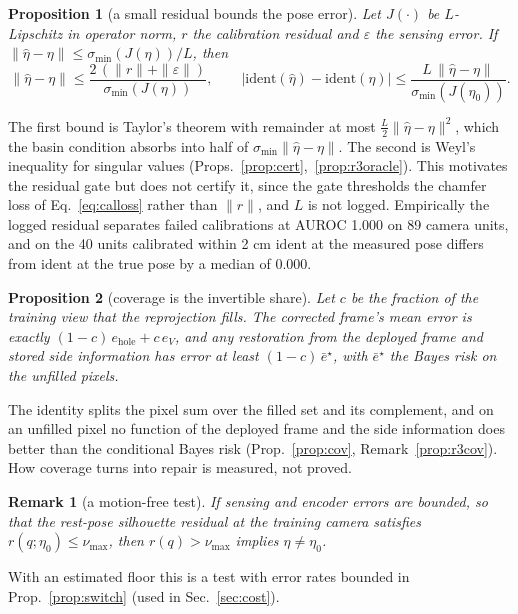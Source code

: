\documentclass{article}
\newtheorem{proposition}{Proposition}
\newtheorem{remark}{Remark}
\newcommand{\ident}{\mathrm{ident}}
\begin{document}
\begin{proposition}[a small residual bounds the pose error]
\label{thm:cert}
Let $J(\cdot)$ be $L$-Lipschitz in operator norm, $r$ the calibration residual and $\varepsilon$ the sensing error. If
$\|\hat\eta - \eta\| \le \sigma_{\min}(J(\eta))/L$, then
\begin{equation}
\|\hat\eta - \eta\| \le \frac{2\,(\|r\| + \|\varepsilon\|)}{\sigma_{\min}(J(\eta))}, \qquad
\big|\ident(\hat\eta) - \ident(\eta)\big| \le \frac{L\,\|\hat\eta - \eta\|}{\sigma_{\min}(J(\eta_0))}.
\label{eq:certmain}
\end{equation}
\end{proposition}
The first bound is Taylor's theorem with remainder at most $\tfrac L2\|\hat\eta - \eta\|^2$, which the basin condition
absorbs into half of $\sigma_{\min}\|\hat\eta - \eta\|$. The second is Weyl's inequality for singular values
(Props.~\ref{prop:cert},~\ref{prop:r3oracle}). This motivates the residual gate but does not certify it, since the gate thresholds the chamfer loss of
Eq.~\ref{eq:calloss} rather than $\|r\|$, and $L$ is not logged. Empirically the logged residual separates failed
calibrations at AUROC 1.000 on 89 camera units, and on the 40 units calibrated
within 2 cm $\ident$ at the measured pose differs from $\ident$ at the true pose by a median of 0.000.

\begin{proposition}[coverage is the invertible share]
\label{thm:cov}
Let $c$ be the fraction of the training view that the reprojection fills. The corrected frame's mean error is exactly
$(1-c)\,e_{\mathrm{hole}} + c\,e_V$, and any restoration from the deployed frame and stored side information has
error at least $(1-c)\,\bar e^\star$, with $\bar e^\star$ the Bayes risk on the unfilled pixels.
\end{proposition}
The identity splits the pixel sum over the filled set and its complement, and on an unfilled pixel no function of the deployed frame and the side information
does better than the conditional Bayes risk (Prop.~\ref{prop:cov}, Remark~\ref{prop:r3cov}). How coverage turns into repair is measured, not proved.

\begin{remark}[a motion-free test]
\label{thm:static}
If sensing and encoder errors are bounded, so that the rest-pose silhouette residual at the training camera satisfies
$r(q;\eta_0) \le \nu_{\max}$, then $r(q) > \nu_{\max}$ implies $\eta \ne \eta_0$.
\end{remark}
With an estimated floor this is a test with error rates bounded in Prop.~\ref{prop:switch} (used in Sec.~\ref{sec:cost}).
\end{document}
